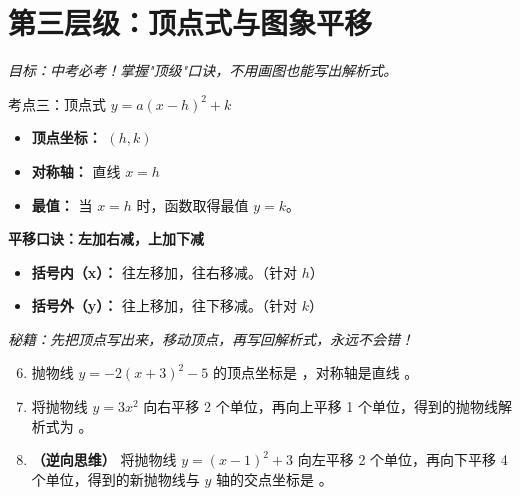 \documentclass[12pt, a4paper]{article}
\begin{document}
\section{第三层级：顶点式与图象平移}
\textit{目标：中考必考！掌握"顶级"口诀，不用画图也能写出解析式。}

\begin{conceptbox}{考点三：顶点式 $y = a(x-h)^2 + k$}
    \begin{itemize}
        \item \textbf{顶点坐标：} $(h, k)$
        \item \textbf{对称轴：} 直线 $x = h$
        \item \textbf{最值：} 当 $x=h$ 时，函数取得最值 $y=k$。
    \end{itemize}
\end{conceptbox}

\begin{tipbox}
    \textbf{平移口诀：左加右减，上加下减}
    \begin{itemize}
        \item \textbf{括号内（x）：} 往左移加，往右移减。（针对 $h$）
        \item \textbf{括号外（y）：} 往上移加，往下移减。（针对 $k$）
    \end{itemize}
    \textit{秘籍：先把顶点写出来，移动顶点，再写回解析式，永远不会错！}
\end{tipbox}

\begin{examplebox}
    \begin{enumerate}[label=\textbf{例\arabic*.}]
        \setcounter{enumi}{5}
        \item 抛物线 $y = -2(x+3)^2 - 5$ 的顶点坐标是 \underline{\hspace{2cm}}，对称轴是直线 \underline{\hspace{2cm}}。
        
        \item 将抛物线 $y = 3x^2$ 向右平移 2 个单位，再向上平移 1 个单位，得到的抛物线解析式为 \underline{\hspace{3cm}}。
        
        \item \textbf{（逆向思维）} 将抛物线 $y = (x-1)^2 + 3$ 向左平移 2 个单位，再向下平移 4 个单位，得到的新抛物线与 $y$ 轴的交点坐标是 \underline{\hspace{2cm}}。
    \end{enumerate}
\end{examplebox}
\end{document}
